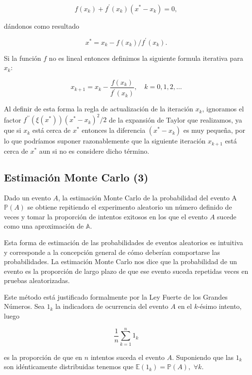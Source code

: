 \documentclass[9pt,twocolumn,twoside,]{pnas-new}
\begin{document}
\[f\left(x_{k}\right)+f^{\prime}\left(x_{k}\right)\left(x^{*}-x_{k}\right) = 0,\]

dándonos como resultado

\[x^{*}=x_{k}-f\left(x_{k}\right) / f^{\prime}\left(x_{k}\right).\]

Si la función \(f\) no es lineal entonces definimos la siguiente formula
iterativa para \(x_k\):

\[
x_{k+1}=x_{k}-\frac{f\left(x_{k}\right)}{f^{\prime}\left(x_{k}\right)}, \quad k=0,1,2, \ldots
\]

Al definir de esta forma la regla de actualización de la iteración
\(x_k\), ignoramos el factor
\(f^{\prime \prime}\left(\xi\left(x^{*}\right)\right)\left(x^{*}-x_{k}\right)^{2} / 2\)
de la expansión de Taylor que realizamos, ya que si \(x_k\) está cerca
de \(x^*\) entonces la diferencia \(\left(x^{*}-x_{k}\right)\) es muy
pequeña, por lo que podríamos suponer razonablemente que la siguiente
iteración \(x_{k+1}\) está cerca de \(x^*\) aun si no es considere dicho
término.

\hypertarget{estimaciuxf3n-monte-carlo-dobrow2016introduction}{%
\subsection{Estimación Monte Carlo
(3)}\label{estimaciuxf3n-monte-carlo-dobrow2016introduction}}

Dado un evento \(A\), la estimación Monte Carlo de la probabilidad del
evento A \(\mathbb{P}(A)\) se obtiene repitiendo el experimento
aleatorio un número definido de veces y tomar la proporción de intentos
exitosos en los que el evento \(A\) sucede como una aproximación de
\(\mathbb{A}\).

Esta forma de estimación de las probabilidades de eventos aleatorios es
intuitiva y corresponde a la concepción general de cómo deberían
comportarse las probabilidades. La estimación Monte Carlo nos dice que
la probabilidad de un evento es la proporción de largo plazo de que ese
evento suceda repetidas veces en pruebas aleatorizadas.

Este método está justificado formalmente por la Ley Fuerte de los
Grandes Números. Sea \(1_k\) la indicadora de ocurrencia del evento
\(A\) en el \(k\)-ésimo intento, luego

\[\frac{1}{n}\sum_{k=1}^n 1_k\]

es la proporción de que en \(n\) intentos suceda el evento \(A\).
Suponiendo que las \(1_k\) son idénticamente distribuidas tenemos que
\(\mathbb{E}(1_k)=\mathbb{P}(A), \,\, \forall k\).
\end{document}
